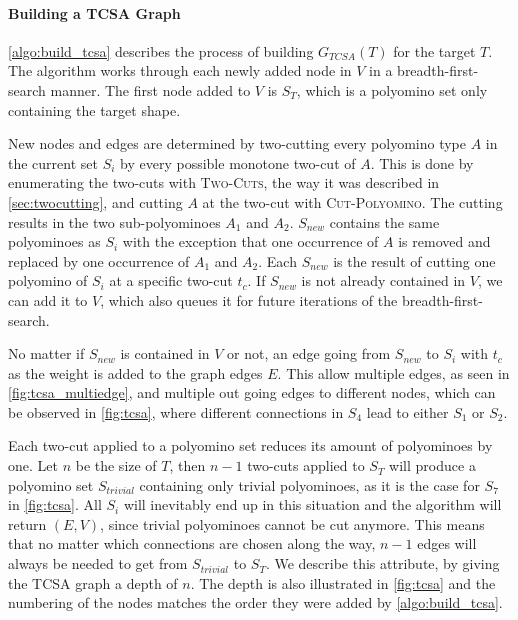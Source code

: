 \paragraph{Building a TCSA Graph}

\autoref{algo:build_tcsa} describes the process of building $G_{TCSA}(T)$ for the target $T$.
The algorithm works through each newly added node in $V$ in a breadth-first-search manner.
The first node added to $V$ is $S_T$, which is a polyomino set only containing the target shape.

New nodes and edges are determined by two-cutting every polyomino type $A$ in the current set $S_i$ by every possible monotone two-cut of $A$.
This is done by enumerating the two-cuts with {\scshape Two-Cuts}, the way it was described in \autoref{sec:twocutting}, and cutting $A$ at the two-cut with {\scshape Cut-Polyomino}.
The cutting results in the two sub-polyominoes $A_1$ and $A_2$.
$S_{new}$ contains the same polyominoes as $S_i$ with the exception that one occurrence of $A$ is removed and replaced by one occurrence of $A_1$ and $A_2$.
Each $S_{new}$ is the result of cutting one polyomino of $S_i$ at a specific two-cut $t_c$.
If $S_{new}$ is not already contained in $V$, we can add it to $V$, which also queues it for future iterations of the breadth-first-search.

No matter if $S_{new}$ is contained in $V$ or not, an edge going from $S_{new}$ to $S_i$ with $t_c$ as the weight is added to the graph edges $E$.
This allow multiple edges, as seen in \autoref{fig:tcsa_multiedge}, and multiple out going edges to different nodes, which can be observed in \autoref{fig:tcsa}, where different connections in $S_4$ lead to either $S_1$ or $S_2$.

Each two-cut applied to a polyomino set reduces its amount of polyominoes by one.
Let $n$ be the size of $T$, then $n-1$ two-cuts applied to $S_T$ will produce a polyomino set $S_{trivial}$ containing only trivial polyominoes, as it is the case for $S_7$ in \autoref{fig:tcsa}.
All $S_i$ will inevitably end up in this situation and the algorithm will return $(E,V)$, since trivial polyominoes cannot be cut anymore.
This means that no matter which connections are chosen along the way, $n-1$ edges will always be needed to get from $S_{trivial}$ to $S_T$.
We describe this attribute, by giving the TCSA graph a depth of $n$.
The depth is also illustrated in \autoref{fig:tcsa} and the numbering of the nodes matches the order they were added by \autoref{algo:build_tcsa}.

